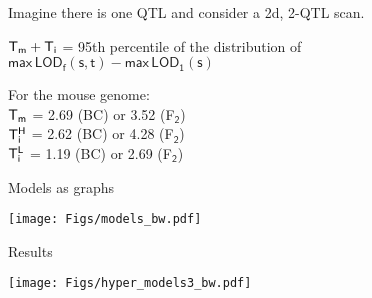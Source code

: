 \documentclass[12pt]{article}
\newcommand{\headsize}{\fontsize{35}{35} \selectfont}
\newcommand{\lod}{\text{LOD}}
\begin{document}
\hfill \begin{minipage}{10in}

Imagine there is one QTL and consider a 2d, 2-QTL scan.

\vspace{1cm}

\hspace*{0.5in} $\mathsf{\color{mypink} T_m + T_i}$ = 95th percentile of the
  distribution of \\[6pt]
\hspace*{2.0in} {\color{myblue} $\mathsf{ \text{max} \, \lod_f(s,t) -
    \text{max} \, \lod_1(s)}$}


\vspace{2cm}

For the mouse genome: \\[12pt]
\hspace*{0.5in} $\mathsf{\color{mypink} T_m}$ = {\color{myblue}
  2.69} (BC) or {\color{myblue} 3.52} (F$_{\mathsf{2}}$) \\[12pt]
\hspace*{0.5in} $\mathsf{\color{mypink} T^H_i}$ = {\color{myblue}
  2.62} (BC) or {\color{myblue} 4.28} (F$_{\mathsf{2}}$) \\[12pt]
\hspace*{0.5in} $\mathsf{\color{mypink} T^L_i}$ = {\color{myblue}
  1.19} (BC) or {\color{myblue} 2.69} (F$_{\mathsf{2}}$)


\end{minipage}









\newpage

\headsize \color{myyellow}
\hfill \begin{minipage}{5.75in}
\centering
Models as graphs
\end{minipage}

\vfill

\centerline{\texttt{[image: Figs/models\_bw.pdf]}}







\newpage

\headsize \color{myyellow}
\hfill \begin{minipage}{5.75in}
\centering
Results
\end{minipage}

\vfill


\centerline{\texttt{[image: Figs/hyper\_models3\_bw.pdf]}}
\end{document}
